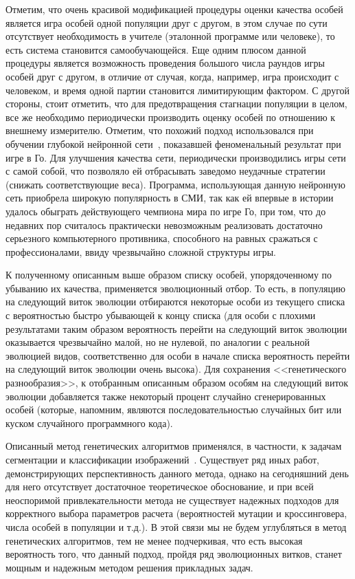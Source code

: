 \documentclass[a4paper,12pt,russian]{article} %
\begin{document}
Отметим, что очень красивой модификацией процедуры оценки качества особей является игра особей одной популяции друг с другом, в этом случае по сути отсутствует необходимость в учителе (эталонной программе или человеке), то есть система становится самообучающейся.
Еще одним плюсом данной процедуры является возможность проведения большого числа раундов игры особей друг с другом, в отличие от случая, когда, например, игра происходит с человеком, и время одной партии становится лимитирующим фактором.
С другой стороны, стоит отметить, что для предотвращения стагнации популяции в целом, все же необходимо периодически производить оценку особей по отношению к внешнему измерителю.
Отметим, что похожий подход использовался при обучении глубокой нейронной сети~\cite{silver2016mastering}, показавшей феноменальный результат при игре в Го.
Для улучшения качества сети, периодически производились игры сети с самой собой, что позволяло ей отбрасывать заведомо неудачные стратегии (снижать соответствующие веса).
Программа, использующая данную нейронную сеть приобрела широкую популярность в СМИ, так как ей впервые в истории удалось обыграть действующего чемпиона мира по игре Го, при том, что до недавних пор считалось практически невозможным реализовать достаточно серьезного компьютерного противника, способного на равных сражаться с профессионалами, ввиду чрезвычайно сложной структуры игры.

К полученному описанным выше образом списку особей, упорядоченному по убыванию их качества, применяется эволюционный отбор.
То есть, в популяцию на следующий виток эволюции отбираются некоторые особи из текущего списка с вероятностью быстро убывающей к концу списка (для особи с плохими результатами таким образом вероятность перейти на следующий виток эволюции оказывается чрезвычайно малой, но не нулевой, по аналогии с реальной эволюцией видов, соответственно для особи в начале списка вероятность перейти на следующий виток эволюции очень высока).
Для сохранения <<генетического разнообразия>>, к отобранным описанным образом особям на следующий виток эволюции добавляется также некоторый процент случайно сгенерированных особей (которые, напомним, являются последовательностью случайных бит или куском случайного программного кода).

Описанный метод генетических алгоритмов применялся, в частности, к задачам сегментации и классификации изображений~\cite{paulinas2015survey}.
Существует ряд иных работ, демонстрирующих перспективность данного метода, однако на сегодняшний день для него отсутствует достаточное теоретическое обоснование, и при всей неоспоримой привлекательности метода не существует надежных подходов для корректного выбора параметров расчета (вероятностей мутации и кроссинговера, числа особей в популяции и т.д.).
В этой связи мы не будем углубляться в метод генетических алгоритмов, тем не менее подчеркивая, что есть высокая вероятность того, что данный подход, пройдя ряд эволюционных витков, станет мощным и надежным методом решения прикладных задач.
\end{document}
